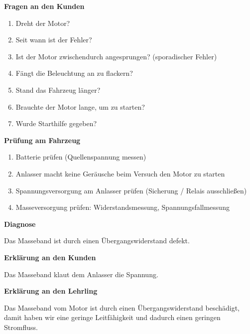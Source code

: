 \textbf{Fragen an den Kunden}

\begin{enumerate}
\item
  Dreht der Motor?
\item
  Seit wann ist der Fehler?
\item
  Ist der Motor zwischendurch angesprungen? (sporadischer Fehler)
\item
  Fängt die Beleuchtung an zu flackern?
\item
  Stand das Fahrzeug länger?
\item
  Brauchte der Motor lange, um zu starten?
\item
  Wurde Starthilfe gegeben?
\end{enumerate}

\textbf{Prüfung am Fahrzeug}

\begin{enumerate}
\item
  Batterie prüfen (Quellenspannung messen)
\item
  Anlasser macht keine Geräusche beim Versuch den Motor zu starten
\item
  Spannungsversorgung am Anlasser prüfen (Sicherung / Relais
  ausschließen)
\item
  Masseversorgung prüfen: Widerstandsmessung, Spannungsfallmessung
\end{enumerate}

\textbf{Diagnose}

Das Masseband ist durch einen Übergangswiderstand defekt.

\textbf{Erklärung an den Kunden}

Das Masseband klaut dem Anlasser die Spannung.

\textbf{Erklärung an den Lehrling}

Das Masseband vom Motor ist durch einen Übergangswiderstand beschädigt,
damit haben wir eine geringe Leitfähigkeit und dadurch einen geringen
Stromfluss.
